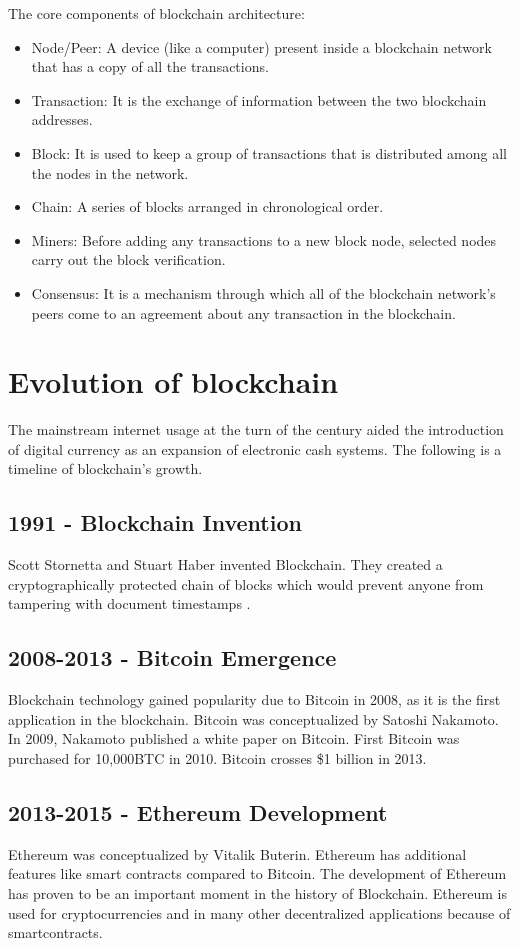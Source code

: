 The core components of blockchain architecture:
\begin{itemize}
    \item Node/Peer: A device (like a computer) present inside a blockchain network that has a copy of all the transactions.
    \item Transaction: It is the exchange of information between the two blockchain addresses.
    \item Block: It is used to keep a group of transactions that is distributed among all the nodes in the network.
    \item Chain: A series of blocks arranged in chronological order.
    \item Miners: Before adding any transactions to a new block node, selected nodes carry out the block verification.
    \item Consensus:  It is a mechanism through which all of the blockchain network's peers come to an agreement about any transaction in the blockchain.
\end{itemize}

\section{Evolution of blockchain}

The mainstream internet usage at the turn of the century aided the introduction of digital currency as an expansion of electronic cash systems. The following is a timeline of blockchain's growth.

\subsection{1991 - Blockchain Invention}
Scott Stornetta and Stuart Haber invented Blockchain. They created a cryptographically protected chain of blocks which would prevent anyone from tampering with document timestamps \cite{history}. 

\subsection{2008-2013 - Bitcoin Emergence}
Blockchain technology gained popularity due to Bitcoin in 2008, as it is the first application in the blockchain. Bitcoin was conceptualized by Satoshi Nakamoto. In 2009, Nakamoto published a white paper on Bitcoin. First Bitcoin was purchased for 10,000BTC in 2010. Bitcoin crosses \$1 billion in 2013.

\subsection{2013-2015 - Ethereum Development}
Ethereum was conceptualized by Vitalik Buterin. Ethereum has additional features like  smart contracts compared to Bitcoin. The development of  Ethereum has proven to be an important moment in the history of Blockchain.  Ethereum is used for cryptocurrencies and in many other decentralized applications because of smartcontracts.


